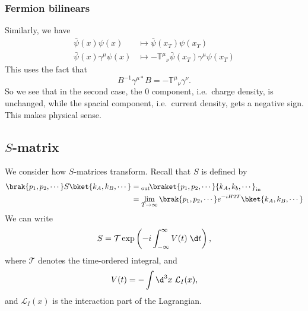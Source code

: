 \documentclass[a4paper]{article}
\begin{document}
\subsubsection*{Fermion bilinears}
Similarly, we have
\begin{align*}
  \bar\psi (x) \psi(x) &\mapsto \bar\psi(x_T) \psi(x_T)\\
  \bar\psi(x) \gamma^\mu \psi(x) &\mapsto -\mathbb{T}^\mu\!_\nu \bar\psi(x_T) \gamma^\mu \psi(x_T)
\end{align*}
This uses the fact that
\[
  B^{-1} \gamma^{\mu*}B = - \mathbb{T}^\mu\!_\nu \gamma^\nu.
\]
So we see that in the second case, the $0$ component, i.e.\ charge density, is unchanged, while the spacial component, i.e.\ current density, gets a negative sign. This makes physical sense.

\subsection{\texorpdfstring{$S$}{S}-matrix}
We consider how $S$-matrices transform. Recall that $S$ is defined by
\begin{align*}
  \brak{p_1, p_2, \cdots} S \bket{k_A, k_B, \cdots} &={} _{\mathrm{out}}\!\braket{p_1, p_2, \cdots}{k_A, k_b, \cdots}_{\mathrm{in}} \\
  &= \lim_{T \to \infty} \brak{p_1, p_2, \cdots} e^{-iH2T} \bket{k_A, k_B, \cdots}
\end{align*}
We can write
\[
  S = \mathcal{T} \exp\left(-i \int_{-\infty}^\infty V(t) \;\d t\right),
\]
where $\mathcal{T}$ denotes the time-ordered integral, and
\[
  V(t) = -\int \d^3 x\; \mathcal{L}_I(x),
\]
and $\mathcal{L}_I(x)$ is the interaction part of the Lagrangian.
\end{document}
